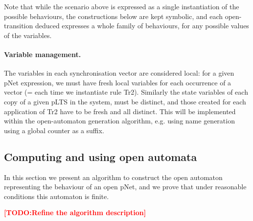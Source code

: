 \documentclass{lncs/llncs}
\newcommand{\TODO}[1]{\textcolor{red}{\textbf{[TODO:#1]}}}
\begin{document}
    

Note that while the scenario above is expressed as a single
instantiation of the possible behaviours, the constructions below are
kept symbolic, and each open-transition deduced expresses a whole family of
behaviours, for any possible values of the variables.

\paragraph{Variable management.}
The variables in each synchronisation vector are considered local:
for a given pNet expression, we must have fresh local variables for
each occurrence of a vector (= each time we instantiate rule
Tr2). Similarly the state variables of each copy of a
given pLTS in the system, must be distinct, and those created for each
application of Tr2 have to be fresh and all distinct. 
This will be implemented within the open-automaton generation algorithm,
e.g. using name generation using a global counter as a suffix.


\subsection{Computing and using open automata}
In this section we present an algorithm to construct the open
automaton representing the behaviour of an open pNet, and we prove that
under reasonable conditions this automaton is finite.

\TODO{Refine the algorithm description}
\end{document}
